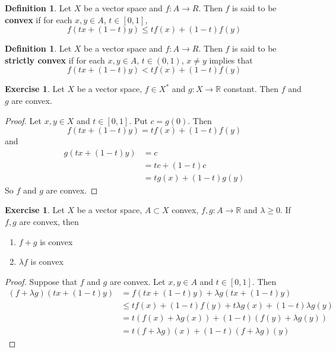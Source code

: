 \documentclass[12pt]{amsart}
\theoremstyle{definition}
\newtheorem{defn}[definition]{Definition}
\newtheorem{ex}[definition]{Exercise}
\newcommand{\lam}{\lambda}
\newcommand{\R}{\mathbb{R}}
\newcommand{\ui}{[0,1]}
\newcommand{\lex}[1]{\label{ex:#1}}
\newcommand{\ld}[1]{\label{defn:#1}}
\begin{document}
	\begin{defn} \ld{}
	Let $X$ be a vector space and $f:A \rightarrow R$. Then $f$ is said to be \textbf{convex} if for each $x,y \in A$, $t \in \ui$, $$f(tx + (1-t)y) \leq tf(x) + (1-t)f(y)$$
	\end{defn}
	
	\begin{defn} \ld{}
	Let $X$ be a vector space and $f:A \rightarrow R$. Then $f$ is said to be \textbf{strictly convex} if for each $x,y \in A$, $t \in (0,1)$, $x \neq y$ implies that $$f(tx + (1-t)y) < tf(x) + (1-t)f(y)$$
	\end{defn}
	
	\begin{ex} \lex{}
	Let $X$ be a vector space, $f \in X^*$ and $g: X \rightarrow \R$ constant. Then $f$ and $g$ are convex. 
	\end{ex}
	
	\begin{proof}
		Let $x, y \in X$ and $t \in \ui$. Put $c = g(0)$. Then $$f(tx + (1-t)y) = tf(x) + (1-t)f(y)$$ and 
		\begin{align*}
		g(tx + (1-t)y) 
		&= c\\ 
		&= tc + (1-t)c \\
		&= tg(x) + (1-t)g(y)
		\end{align*}
		So $f$ and $g$ are convex.
	\end{proof}		
	
	\begin{ex} \lex{}
	Let $X$ be a vector space, $A \subset X$ convex, $f,g:A \rightarrow \R$ and $\lam \geq 0$. If $f,g$ are convex, then 
	\begin{enumerate}
	\item $f + g$ is convex 
	\item $\lam f$ is convex
	\end{enumerate}
	\end{ex}
	
	\begin{proof}
	Suppose that $f$ and $g$ are convex. Let $x,y \in A$ and $t \in [0,1]$. Then 
	\begin{align*}
	(f + \lam g)(tx + (1-t)y) 
	&= f(tx + (1-t)y) + \lam g(tx + (1-t)y) \\
	& \leq tf(x) + (1-t)f(y) +  t \lam g(x) + (1-t)\lam g(y) \\
	&= t(f(x) + \lam g(x)) + (1-t)(f(y) + \lam g(y))\\
	& = t(f + \lam g)(x) + (1-t)(f + \lam g)(y)
\end{align*}		 
	\end{proof}
	
\end{document}
